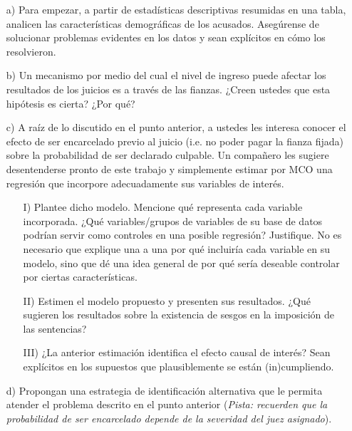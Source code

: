 \documentclass[a4paper]{article}
\begin{document}
\begin{itemize}
    \item[a)] Para empezar, a partir de estadísticas descriptivas resumidas en una tabla, analicen las características demográficas de los acusados. Asegúrense de solucionar problemas evidentes en los datos y sean explícitos en cómo los resolvieron.\\
    
     \item[b)] Un mecanismo por medio del cual el nivel de ingreso puede afectar los resultados de los juicios es a través de las fianzas. ¿Creen ustedes que esta hipótesis es cierta? ¿Por qué?\\
     
      \item[c)] A raíz de lo discutido en el punto anterior, a ustedes les interesa conocer el efecto de ser encarcelado previo al juicio (i.e. no poder pagar la fianza fijada) sobre la probabilidad de ser declarado culpable. Un compañero les sugiere desentenderse pronto de este trabajo y simplemente estimar por MCO una regresión que incorpore adecuadamente sus variables de interés. 
    
    \begin{itemize}
        \item[I)] Plantee dicho modelo. Mencione qué representa cada variable incorporada. ¿Qué variables/grupos de variables de su base de datos podrían servir como controles en una posible regresión? Justifique. No es necesario que explique una a una por qué incluiría cada variable en su modelo, sino que dé una idea general de por qué sería deseable controlar por ciertas características.
        
          \item[II)] Estimen el modelo propuesto y presenten sus resultados. ¿Qué sugieren los resultados sobre la existencia de sesgos en la imposición de las sentencias?
          
          \item[III)] ¿La anterior estimación identifica el efecto causal de interés? Sean explícitos en los supuestos que plausiblemente se están (in)cumpliendo.
\end{itemize}

    \item[d)] Propongan una estrategia de identificación alternativa que le permita atender el problema descrito en el punto anterior (\textit{Pista: recuerden que la probabilidad de ser encarcelado depende de la severidad del juez asignado}). \\
    

\end{itemize}
\end{document}
